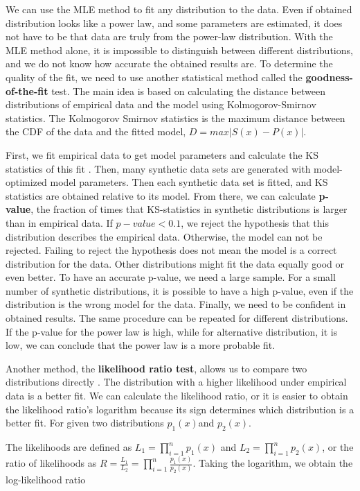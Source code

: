 We can use the MLE \cite{clauset2009power} method to fit any distribution to the data. Even if obtained distribution looks like a power law, and some parameters are estimated, it does not have to be that data are truly from the power-law distribution. With the MLE method alone, it is impossible to distinguish between different distributions, and we do not know how accurate the obtained results are. To determine the quality of the fit, we need to use another statistical method called the \textbf{goodness-of-the-fit} test. The main idea is based on calculating the distance between distributions of empirical data and the model using Kolmogorov-Smirnov statistics. The Kolmogorov Smirnov statistics is the maximum distance between the CDF of the data and the fitted model, $D = max |S(x) - P(x)|$.

First, we fit empirical data to get model parameters and calculate the KS statistics of this fit \cite{clauset2009power}. Then, many synthetic data sets are generated with model-optimized model parameters. Then each synthetic data set is fitted, and KS statistics are obtained relative to its model. From there, we can calculate \textbf{p-value}, the fraction of times that KS-statistics in synthetic distributions is larger than in empirical data.  If $p-value<0.1$, we reject the hypothesis that this distribution describes the empirical data. Otherwise, the model can not be rejected. Failing to reject the hypothesis does not mean the model is a correct distribution for the data. Other distributions might fit the data equally good or even better. To have an accurate p-value, we need a large sample. For a small number of synthetic distributions, it is possible to have a high p-value, even if the distribution is the wrong model for the data. Finally, we need to be confident in obtained results. The same procedure can be repeated for different distributions. If the p-value for the power law is high, while for alternative distribution, it is low, we can conclude that the power law is a more probable fit. 

Another method, the \textbf{likelihood ratio test}, allows us to compare two distributions directly \cite{clauset2009power}. The distribution with a higher likelihood under empirical data is a better fit. We can calculate the likelihood ratio, or it is easier to obtain the likelihood ratio's logarithm because its sign determines which distribution is a better fit. For given two distributions $p_1(x)$and $p_2(x)$. 

The likelihoods are defined as $L_1=\prod_{i=1}^{n}p_1(x)$ and $L_2=\prod_{i=1}^{n}p_2(x)$, or the ratio of likelihoods as $R=\frac{L_1}{L_2} = \prod_{i=1}^{n} \frac{p_1(x)}{p_2(x)}$. Taking the logarithm, we obtain the log-likelihood ratio

